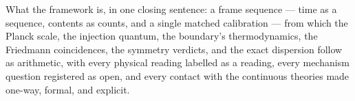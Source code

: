 \documentclass[11pt]{amsbook}
\theoremstyle{plain}
\theoremstyle{definition}
\theoremstyle{remark}
\begin{document}
What the framework is, in one closing sentence: a frame sequence --- time as a sequence, contents as counts, and a single matched calibration --- from which the Planck scale, the injection quantum, the boundary's thermodynamics, the Friedmann coincidences, the symmetry verdicts, and the exact dispersion follow as arithmetic, with every physical reading labelled as a reading, every mechanism question registered as open, and every contact with the continuous theories made one-way, formal, and explicit.
\end{document}
